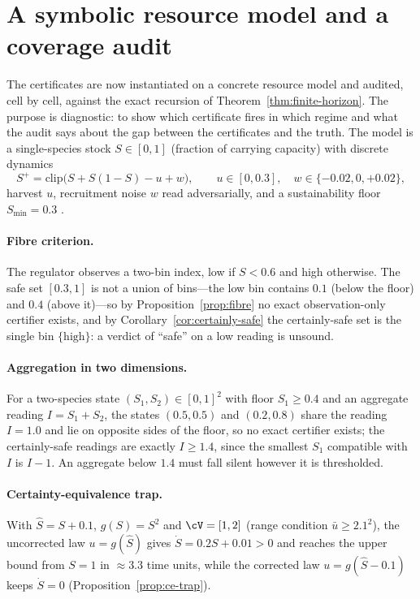 \section{A symbolic resource model and a coverage audit}\label{sec:casestudy}

The certificates are now instantiated on a concrete resource model and audited, cell by cell, against the exact recursion of Theorem~\ref{thm:finite-horizon}. The purpose is diagnostic: to show which certificate fires in which regime and what the audit says about the gap between the certificates and the truth. The model is a single-species stock $S\in[0,1]$ (fraction of carrying capacity) with discrete dynamics
\[
S^+=\mathrm{clip}\bigl(S+S(1-S)-u+w\bigr),\qquad u\in[0,0.3],\quad w\in\{-0.02,0,+0.02\},
\]
harvest $u$, recruitment noise $w$ read adversarially, and a sustainability floor $S_{\min}=0.3$ \citep{clark1990}.

\paragraph{Fibre criterion.} The regulator observes a two-bin index, low if $S<0.6$ and high otherwise. The safe set $[0.3,1]$ is not a union of bins---the low bin contains $0.1$ (below the floor) and $0.4$ (above it)---so by Proposition~\ref{prop:fibre} no exact observation-only certifier exists, and by Corollary~\ref{cor:certainly-safe} the certainly-safe set is the single bin $\{\text{high}\}$: a verdict of ``safe'' on a low reading is unsound.

\paragraph{Aggregation in two dimensions.} For a two-species state $(S_1,S_2)\in[0,1]^2$ with floor $S_1\ge0.4$ and an aggregate reading $I=S_1+S_2$, the states $(0.5,0.5)$ and $(0.2,0.8)$ share the reading $I=1.0$ and lie on opposite sides of the floor, so no exact certifier exists; the certainly-safe readings are exactly $I\ge1.4$, since the smallest $S_1$ compatible with $I$ is $I-1$. An aggregate below $1.4$ must fall silent however it is thresholded.

\paragraph{Certainty-equivalence trap.} With $\hat S=S+0.1$, $g(S)=S^2$ and $\cV=[1,2]$ (range condition $\bar u\ge2.1^2$), the uncorrected law $u=g(\hat S)$ gives $\dot S=0.2S+0.01>0$ and reaches the upper bound from $S=1$ in $\approx3.3$ time units, while the corrected law $u=g(\hat S-0.1)$ keeps $\dot S=0$ (Proposition~\ref{prop:ce-trap}).

